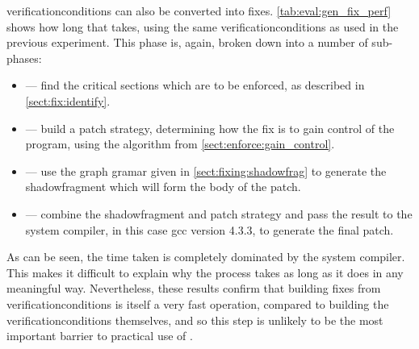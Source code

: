 \Glspl{verificationcondition} can also be converted into fixes.
\autoref{tab:eval:gen_fix_perf} shows how long that takes, using the
same \glspl{verificationcondition} as used in the previous experiment.
This phase is, again, broken down into a number of sub-phases:
\begin{itemize}
\item {} --- find the critical sections which are to be enforced,
  as described in \autoref{sect:fix:identify}.
\item {} --- build a patch strategy, determining how the fix
  is to gain control of the program, using the algorithm from
  \autoref{sect:enforce:gain_control}.
\item {} --- use the graph gramar given in
  \autoref{sect:fixing:shadowfrag} to generate the
  \gls{shadowfragment} which will form the body of the patch.
\item {} --- combine the \gls{shadowfragment} and patch
  strategy and pass the result to the system compiler, in this case gcc
  version 4.3.3, to generate the final patch.
\end{itemize}
As can be seen, the time taken is completely dominated by the system
compiler.  This makes it difficult to explain why the process takes as
long as it does in any meaningful way.  Nevertheless, these results
confirm that building fixes from \glspl{verificationcondition} is
itself a very fast operation, compared to building the
\glspl{verificationcondition} themselves, and so this step is unlikely
to be the most important barrier to practical use of {\technique}.

